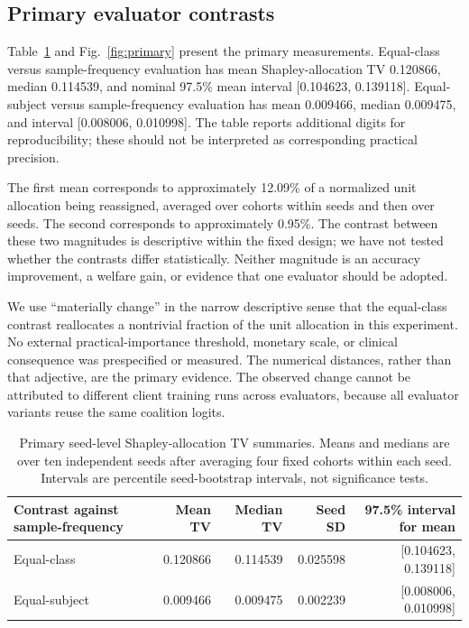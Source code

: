 \documentclass[conference,letterpaper]{IEEEtran}
\begin{document}
\subsection{Primary evaluator contrasts}
Table~\ref{tab:primary} and Fig.~\ref{fig:primary} present the primary measurements. Equal-class versus sample-frequency evaluation has mean Shapley-allocation TV 0.120866, median 0.114539, and nominal 97.5\% mean interval [0.104623, 0.139118]. Equal-subject versus sample-frequency evaluation has mean 0.009466, median 0.009475, and interval [0.008006, 0.010998]. The table reports additional digits for reproducibility; these should not be interpreted as corresponding practical precision.

The first mean corresponds to approximately 12.09\% of a normalized unit allocation being reassigned, averaged over cohorts within seeds and then over seeds. The second corresponds to approximately 0.95\%. The contrast between these two magnitudes is descriptive within the fixed design; we have not tested whether the contrasts differ statistically. Neither magnitude is an accuracy improvement, a welfare gain, or evidence that one evaluator should be adopted.

We use ``materially change'' in the narrow descriptive sense that the equal-class contrast reallocates a nontrivial fraction of the unit allocation in this experiment. No external practical-importance threshold, monetary scale, or clinical consequence was prespecified or measured. The numerical distances, rather than that adjective, are the primary evidence. The observed change cannot be attributed to different client training runs across evaluators, because all evaluator variants reuse the same coalition logits.

\begin{table}[t]
\caption{Primary seed-level Shapley-allocation TV summaries. Means and medians are over ten independent seeds after averaging four fixed cohorts within each seed. Intervals are percentile seed-bootstrap intervals, not significance tests.}
\label{tab:primary}\centering
\begin{tabular}{lrrrr}\toprule
Contrast against sample-frequency & Mean TV & Median TV & Seed SD & 97.5\% interval for mean\\\midrule
Equal-class & 0.120866 & 0.114539 & 0.025598 & [0.104623, 0.139118]\\
Equal-subject & 0.009466 & 0.009475 & 0.002239 & [0.008006, 0.010998]\\\bottomrule
\end{tabular}
\end{table}
\end{document}
